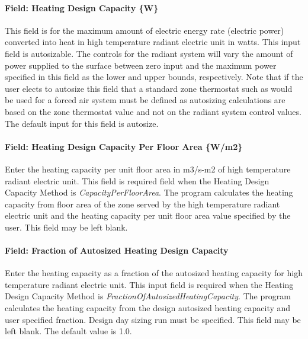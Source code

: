 \paragraph{Field: Heating Design Capacity \{W\}}\label{field-heating-design-capacity-w-7}

This field is for the maximum amount of electric energy rate (electric power) converted into heat in high temperature radiant electric unit in watts. This input field is autosizable. The controls for the radiant system will vary the amount of power supplied to the surface between zero input and the maximum power specified in this field as the lower and upper bounds, respectively. Note that if the user elects to autosize this field that a standard zone thermostat such as would be used for a forced air system must be defined as autosizing calculations are based on the zone thermostat value and not on the radiant system control values. The default input for this field is autosize.

\paragraph{Field: Heating Design Capacity Per Floor Area \{W/m2\}}\label{field-heating-design-capacity-per-floor-area-wm2-7}

Enter the heating capacity per unit floor area in m3/s-m2 of high temperature radiant electric unit. This field is required field when the Heating Design Capacity Method is \emph{CapacityPerFloorArea}. The program calculates the heating capacity from floor area of the zone served by the high temperature radiant electric unit and the heating capacity per unit floor area value specified by the user. This field may be left blank.

\paragraph{Field: Fraction of Autosized Heating Design Capacity}\label{field-fraction-of-autosized-heating-design-capacity-7}

Enter the heating capacity as a fraction of the autosized heating capacity for high temperature radiant electric unit. This input field is required when the Heating Design Capacity Method is \emph{FractionOfAutosizedHeatingCapacity}. The program calculates the heating capacity from the design autosized heating capacity and user specified fraction. Design day sizing run must be specified. This field may be left blank. The default value is 1.0.


